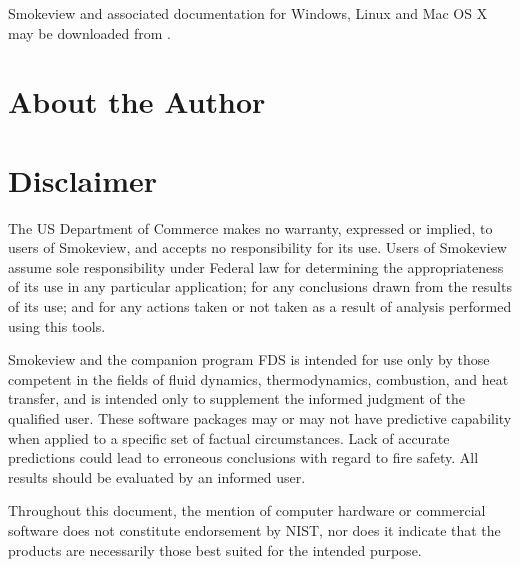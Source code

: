 \documentclass[11pt,twoside]{book}
\begin{document}
Smokeview and associated documentation for Windows, Linux and Mac OS X may be
downloaded from  {\bf {}} .


\chapter{About the Author}
\begin{description}
\gforneybio
\end{description}


\chapter{Disclaimer}

The US Department of Commerce makes no warranty, expressed or implied, to users
of Smokeview, and accepts no responsibility for its use.
Users of Smokeview assume sole responsibility under
Federal law for determining the appropriateness of its use in any
particular application; for any conclusions drawn from the results of its use;
and for any actions taken or not taken as a result of analysis performed using this tools.

Smokeview and the companion program FDS is intended for use only by those competent
in the fields of fluid dynamics, thermodynamics, combustion, and heat transfer, and is
intended only to supplement the informed judgment of the qualified user.
These software packages may or may not have predictive capability when
applied to a specific set of factual circumstances. Lack of accurate predictions
could lead to erroneous conclusions with regard to fire safety. All results should
be evaluated by an informed user.

Throughout this document, the mention of computer hardware or commercial software
does not constitute endorsement by NIST, nor does it indicate that the products are
necessarily those best suited for the intended purpose.
\end{document}
